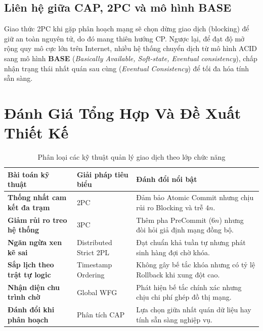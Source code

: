 \documentclass[12pt,a4paper]{report}
\begin{document}
\subsection{Liên hệ giữa CAP, 2PC và mô hình BASE}
Giao thức 2PC khi gặp phân hoạch mạng sẽ chọn dừng giao dịch (blocking) để giữ an toàn nguyên tử, do đó mang thiên hướng CP. Ngược lại, để đạt độ mở rộng quy mô cực lớn trên Internet, nhiều hệ thống chuyển dịch từ mô hình ACID sang mô hình \textbf{BASE} (\textit{Basically Available, Soft-state, Eventual consistency}), chấp nhận trạng thái nhất quán sau cùng (\textit{Eventual Consistency}) để tối đa hóa tính sẵn sàng.

\section{Đánh Giá Tổng Hợp Và Đề Xuất Thiết Kế}

\begin{table}[!ht]
\centering
\small
\caption{Phân loại các kỹ thuật quản lý giao dịch theo lớp chức năng}
\label{tab:transaction_techniques_summary}
\renewcommand{\arraystretch}{1.2}
\begin{tabularx}{\textwidth}{|>{\raggedright\arraybackslash\bfseries}p{4cm}|>{\raggedright\arraybackslash}p{3.5cm}|>{\raggedright\arraybackslash}X|}
\hline
\textbf{Bài toán kỹ thuật} & \textbf{Giải pháp tiêu biểu} & \textbf{Đánh đổi nổi bật} \\ \hline
Thống nhất cam kết đa trạm & 2PC & Đảm bảo Atomic Commit nhưng chịu rủi ro Blocking và trễ $4n$. \\ \hline
Giảm rủi ro treo hệ thống & 3PC & Thêm pha PreCommit ($6n$) nhưng đòi hỏi giả định mạng đồng bộ. \\ \hline
Ngăn ngừa xen kẽ sai & Distributed Strict 2PL & Đạt chuẩn khả tuần tự nhưng phát sinh hàng đợi chờ khóa. \\ \hline
Sắp lịch theo trật tự logic & Timestamp Ordering & Không gây bế tắc khóa nhưng có tỷ lệ Rollback khi xung đột cao. \\ \hline
Nhận diện chu trình chờ & Global WFG & Phát hiện bế tắc chính xác nhưng chịu chi phí ghép đồ thị mạng. \\ \hline
Đánh đổi khi phân hoạch & Phân tích CAP & Lựa chọn giữa nhất quán dữ liệu hay tính sẵn sàng nghiệp vụ. \\ \hline
\end{tabularx}
\end{table}

\end{document}
